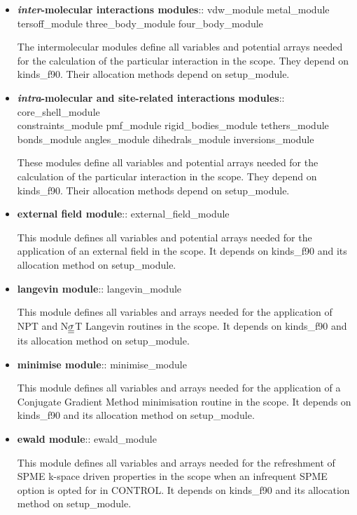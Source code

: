 \begin{itemize}
\item {\bf {\em inter}-molecular interactions modules}:: {\sc
vdw\_module metal\_module \\
tersoff\_module three\_body\_module four\_body\_module}

The intermolecular modules define all variables and potential
arrays needed for the calculation of the particular interaction in
the \D scope.  They depend on {\sc kinds\_f90}.  Their allocation
methods depend on {\sc setup\_module}.

\item {\bf {\em intra}-molecular and site-related interactions
modules}:: {\sc core\_shell\_module \\ constraints\_module pmf\_module
rigid\_bodies\_module tethers\_module \\ bonds\_module angles\_module dihedrals\_module
inversions\_module}

These modules define all variables and potential arrays needed for
the calculation of the particular interaction in the \D scope.
They depend on {\sc kinds\_f90}.  Their allocation methods depend
on {\sc setup\_module}.

\item {\bf external field module}:: {\sc external\_field\_module}

This module defines all variables and potential arrays needed for
the application of an external field in the \D scope.  It depends
on {\sc kinds\_f90} and its allocation method on {\sc setup\_module}.

\item {\bf langevin module}:: {\sc langevin\_module}

This module defines all variables and arrays needed for the
application of NPT and N$\mbox{$\underline{\underline{\bf \sigma}}$}$T Langevin routines
in the \D scope.  It depends on {\sc kinds\_f90} and its
allocation method on {\sc setup\_module}.

\item {\bf minimise module}:: {\sc minimise\_module}

This module defines all variables and arrays needed for the
application of a Conjugate Gradient Method minimisation routine
in the \D scope.  It depends on {\sc kinds\_f90} and its
allocation method on {\sc setup\_module}.

\item {\bf ewald module}:: {\sc ewald\_module}

This module defines all variables and arrays needed for the
refreshment of SPME k-space driven properties in the \D scope
when an infrequent SPME option is opted for in CONTROL.  It
depends on {\sc kinds\_f90} and its allocation method on
{\sc setup\_module}.


\end{itemize}
